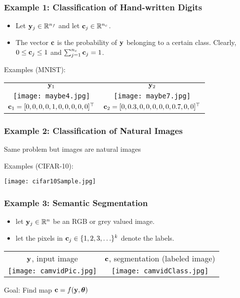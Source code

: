 \documentclass[12pt,fleqn]{beamer}
\begin{document}
\begin{frame}\frametitle{Example 1: Classification of Hand-written Digits }

\begin{itemize}
\item
Let ${\bf y}_j \in \mathbb{R}^{n_f}$ and let ${\bf c}_j\in \mathbb{R}^{n_c}$.
\item
The vector ${\bf c}$ is the probability of ${\bf y}$ belonging to a certain class. Clearly, $0\le {\bf c}_j \le 1$ and $\sum_{j=1}^{n_c} {\bf c}_j = 1$.
\end{itemize}

\vfill

Examples (MNIST):
\begin{center}
	\begin{tabular}{cc}
		${\bf y}_1$ & ${\bf y}_2$\\
	\texttt{[image: maybe4.jpg]} &
	\texttt{[image: maybe7.jpg]} \\
	${\bf c}_1 = [0, 0, 0, 0, 1, 0, 0, 0, 0, 0]^\top$ &
	${\bf c}_2 = [0, 0.3, 0, 0, 0, 0, 0, 0.7, 0, 0]^\top$
	\end{tabular}
	
\end{center}


\end{frame}


\begin{frame}\frametitle{Example 2: Classification of Natural Images}

Same problem but images are natural images

\bigskip

Examples (CIFAR-10):
\begin{center}
\texttt{[image: cifar10Sample.jpg]} 
\end{center}

\end{frame}


\begin{frame}\frametitle{Example 3:  Semantic Segmentation}

\begin{itemize}
	\item
	let ${\bf y}_j \in \mathbb{R}^n$ be an RGB or grey valued image.
	\item let the pixels in ${\bf c}_j\in \{1,2,3,\ldots \}^k$ denote the labels.
\end{itemize}

\begin{center}
	\begin{tabular}{cc}
		${\bf y}$, input image & ${\bf c}$, segmentation (labeled image)\\
	\texttt{[image: camvidPic.jpg]} &
	\texttt{[image: camvidClass.jpg]} 
	\end{tabular}

	Goal: Find map ${\bf c}  = f({\bf y},{\boldsymbol \theta})$ 

\end{center}


\end{frame}
\end{document}

